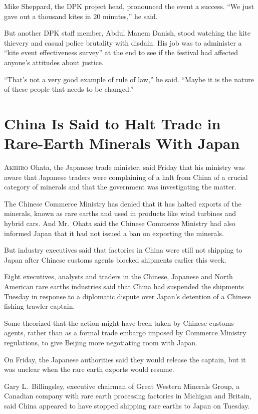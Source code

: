 ﻿\documentclass[12pt]{article}
\begin{document}
Mike Sheppard, the DPK project head, pronounced the event a success. ``We just gave out a thousand
kites in 20 minutes,'' he said.

But another DPK staff member, Abdul Manem Danish, stood watching the kite thievery and casual police
brutality with disdain. His job was to administer a ``kite event effectiveness survey'' at the end
to see if the festival had affected anyone's attitudes about justice.

``That's not a very good example of rule of law,'' he said. ``Maybe it is the nature of these people
that needs to be changed.''

\pagebreak
\section{China Is Said to Halt Trade in Rare-Earth Minerals With Japan}

\lettrine{A}{kihiro} Ohata, the Japanese trade minister, said Friday that
his ministry was aware that Japanese traders were complaining of a halt from China of a crucial
category of minerals and that the government was investigating the matter.

The Chinese Commerce Ministry has denied that it has halted exports of the minerals, known as rare
earths and used in products like wind turbines and hybrid cars. And Mr.~Ohata said the Chinese
Commerce Ministry had also informed Japan that it had not issued a ban on exporting the minerals.

But industry executives said that factories in China were still not shipping to Japan after Chinese
customs agents blocked shipments earlier this week.

Eight executives, analysts and traders in the Chinese, Japanese and North American rare earths
industries said that China had suspended the shipments Tuesday in response to a diplomatic dispute
over Japan's detention of a Chinese fishing trawler captain.

Some theorized that the action might have been taken by Chinese customs agents, rather than as a
formal trade embargo imposed by Commerce Ministry regulations, to give Beijing more negotiating room
with Japan.

On Friday, the Japanese authorities said they would release the captain, but it was unclear when the
rare earth exports would resume.

Gary L.~Billingsley, executive chairman of Great Western Minerals Group, a Canadian company with
rare earth processing factories in Michigan and Britain, said China appeared to have stopped
shipping rare earths to Japan on Tuesday.
\end{document}
